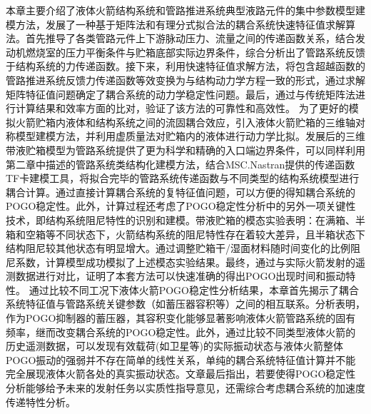 \begin{enumerate}[label=\textbf{\Roman*.}, align=left, leftmargin=0pt, listparindent=\parindent, itemindent=!, labelwidth=\parindent, labelsep=0pt, itemsep=1em]
 本章主要介绍了液体火箭结构系统和管路推进系统典型液路元件的集中参数模型建模方法，发展了一种基于矩阵法和有理分式拟合法的耦合系统快速特征值求解算法。首先推导了各类管路元件上下游脉动压力、流量之间的传递函数关系，结合发动机燃烧室的压力平衡条件与贮箱底部实际边界条件，综合分析出了管路系统反馈于结构系统的力传递函数。接下来，利用快速特征值求解方法，将包含超越函数的管路推进系统反馈力传递函数等效变换为与结构动力学方程一致的形式，通过求解矩阵特征值问题确定了耦合系统的动力学稳定性问题。最后，通过与传统矩阵法进行计算结果和效率方面的比对，验证了该方法的可靠性和高效性。
 为了更好的模拟火箭贮箱内液体和结构系统之间的流固耦合效应，引入液体火箭贮箱的三维轴对称模型建模方法，并利用虚质量法对贮箱内的液体进行动力学比拟。发展后的三维带液贮箱模型为管路系统提供了更为科学和精确的入口端边界条件，可以同样利用第二章中描述的管路系统类结构化建模方法，结合MSC.Nastran提供的传递函数TF卡建模工具，将拟合完毕的管路系统传递函数与不同类型的结构系统模型进行耦合计算。通过直接计算耦合系统的复特征值问题，可以方便的得知耦合系统的POGO稳定性。此外，计算过程还考虑了POGO稳定性分析中的另外一项关键性技术，即结构系统阻尼特性的识别和建模。带液贮箱的模态实验表明：在满箱、半箱和空箱等不同状态下，火箭结构系统的阻尼特性存在着较大差异，且半箱状态下结构阻尼较其他状态有明显增大。通过调整贮箱干/湿面材料随时间变化的比例阻尼系数，计算模型成功模拟了上述模态实验结果。最终，通过与实际火箭发射的遥测数据进行对比，证明了本套方法可以快速准确的得出POGO出现时间和振动特性。
 通过比较不同工况下液体火箭POGO稳定性分析结果，本章首先揭示了耦合系统特征值与管路系统关键参数（如蓄压器容积等）之间的相互联系。分析表明，作为POGO抑制器的蓄压器，其容积变化能够显著影响液体火箭管路系统的固有频率，继而改变耦合系统的POGO稳定性。此外，通过比较不同类型液体火箭的历史遥测数据，可以发现有效载荷(如卫星等)的实际振动状态与液体火箭整体POGO振动的强弱并不存在简单的线性关系，单纯的耦合系统特征值计算并不能完全展现液体火箭各处的真实振动状态。文章最后指出，若要使得POGO稳定性分析能够给予未来的发射任务以实质性指导意见，还需综合考虑耦合系统的加速度传递特性分析。
\end{enumerate}